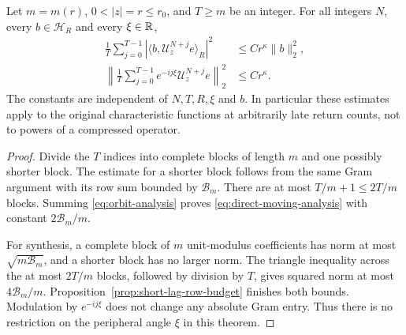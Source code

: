 \begin{theorem}
\label{thm:direct-moving-averages}
Let $m=m(r)$, $0<|z|=r\le r_0$, and $T\ge m$ be an integer.
For all integers $N$, every $b\in\mathcal H_R$ and every
$\xi\in\mathbb R$,
\begin{align}
 \frac1T\sum_{j=0}^{T-1}
     |\langle b,\mathcal U_z^{N+j}e\rangle_R|^2
                         &\le Cr^\kappa\|b\|_2^2,
                            \label{eq:direct-moving-analysis}\\
 \left\|\frac1T\sum_{j=0}^{T-1}
      e^{-ij\xi}\mathcal U_z^{N+j}e\right\|_2^2
                         &\le Cr^\kappa.
                            \label{eq:direct-moving-synthesis}
\end{align}
The constants are independent of $N,T,R,\xi$ and $b$. In particular
these estimates apply to the original characteristic functions at
arbitrarily late return counts, not to powers of a compressed operator.
\end{theorem}
\begin{proof}
Divide the $T$ indices into complete blocks of length $m$ and one
possibly shorter block. The estimate for a shorter block follows from
the same Gram argument with its row sum bounded by $\mathcal B_m$.
There are at most $T/m+1\le2T/m$ blocks. Summing
\eqref{eq:orbit-analysis} proves
\eqref{eq:direct-moving-analysis} with constant
$2\mathcal B_m/m$.

For synthesis, a complete block of $m$ unit-modulus coefficients has
norm at most $\sqrt{m\mathcal B_m}$, and a shorter block has no
larger norm. The triangle inequality across the at most $2T/m$
blocks, followed by division by $T$, gives squared norm at most
$4\mathcal B_m/m$. Proposition~\ref{prop:short-lag-row-budget}
finishes both bounds. Modulation by $e^{-ij\xi}$ does not change any
absolute Gram entry. Thus there is no restriction on the peripheral
angle $\xi$ in this theorem.
\end{proof}

